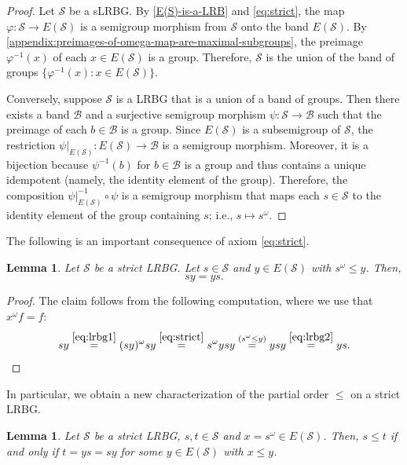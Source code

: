 \documentclass[11pt, oneside, reqno]{amsart}
\newtheorem{lemma}[theorem]{Lemma}
\theoremstyle{definition}
\numberwithin{equation}{section}
\def \BB{{\mathcal{B}}}
\def \SS{{\mathcal{S}}}
\begin{document}
\begin{proof}
    Let $\SS$ be a sLRBG. By \cref{E(S)-is-a-LRB} and \cref{eq:strict}, the map
    $\varphi: \SS \to E(\SS)$ is a semigroup morphism from $\SS$ onto the band
    $E(\SS)$. By \cref{appendix:preimages-of-omega-map-are-maximal-subgroups},
    the preimage $\varphi^{-1}(x)$ of each $x \in E(\SS)$ is
    a group. Therefore, $\SS$ is the union of the band of groups
    $\{\varphi^{-1}(x) : x \in E(\SS)\}$.

    Conversely, suppose $\SS$ is a LRBG that is a union of a band of groups.
    Then there exists a band $\BB$ and a surjective semigroup morphism $\psi:
    \SS \xrightarrow{} \BB$ such that the preimage of each $b \in \BB$ is
    a group.
    Since $E(\SS)$ is a subsemigroup of $\SS$, the restriction
    $\psi|_{E(\SS)}: E(\SS) \to \BB$ is a semigroup morphism.
    Moreover, it is a bijection because $\psi^{-1}(b)$ for $b \in \BB$ is
    a group and thus contains a unique idempotent (namely, the identity element
    of the group).
    Therefore, the composition
    $\psi|_{E(\SS)}^{-1} \circ \psi$
    is a semigroup morphism that maps each $s \in \SS$ to the identity element
    of the group containing $s$; i.e., $s \mapsto s^\omega$.
\end{proof}

The following is an important consequence of axiom \cref{eq:strict}.

\begin{lemma}\label{lem:xf=fx}
    Let $\SS$ be a strict LRBG.
    Let $s \in \SS$ and $y \in E(\SS)$ with $s^\omega \leq y$. Then,
    \[        sy = ys.      \]
\end{lemma}

\begin{proof}
    The claim follows from the following computation, where we use that $x^\omega f = f$:
    \begin{equation*}
        s y                         \overset{\cref{eq:lrbg1}}{=}
        (s y)^\omega s y            \overset{\cref{eq:strict}}{=}
        s^\omega y s y              \overset{(s^\omega \leq y)}{=}
        y s y                       \overset{\cref{eq:lrbg2}}{=}
        y s.                        \qedhere 
    \end{equation*}
\end{proof}

In particular, we obtain a new characterization of the partial order $\leq$ on a strict LRBG.

\begin{lemma}\label{lem:sLRBG-leq}
    Let $\SS$ be a strict LRBG, $s,t \in \SS$ and $x = s^\omega \in E(\SS)$.
    Then, $s \leq t$ if and only if $t = ys = sy$ for some $y \in E(\SS)$ with $x \leq y$.
\end{lemma}
\end{document}
